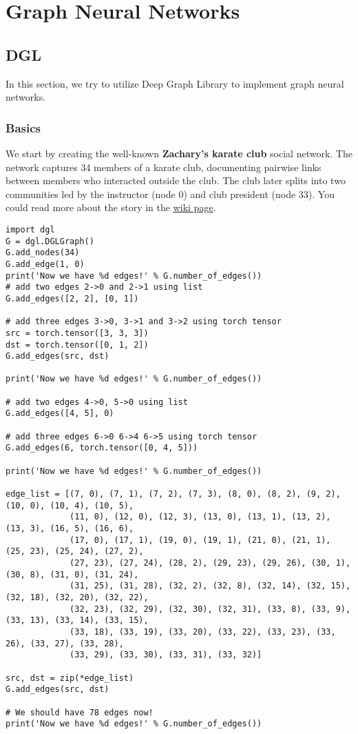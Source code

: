 \chapter{Graph Neural Networks}
\section{DGL}
In this section, we try to utilize Deep Graph Library to implement graph neural networks.

\subsection{Basics}
We start by creating the well-known \textbf{Zachary's karate club} social network. The network captures 34 members of a karate club, documenting pairwise links between members who interacted outside the club. The club later splits into two communities led by the instructor (node 0) and club president (node 33). You could read more about the story in the \href{https://en.wikipedia.org/wiki/Zachary\%27s_karate_club}{wiki page}. 

\begin{verbatim}
import dgl
G = dgl.DGLGraph()
G.add_nodes(34)
G.add_edge(1, 0)
print('Now we have %d edges!' % G.number_of_edges())
# add two edges 2->0 and 2->1 using list
G.add_edges([2, 2], [0, 1])

# add three edges 3->0, 3->1 and 3->2 using torch tensor
src = torch.tensor([3, 3, 3])
dst = torch.tensor([0, 1, 2])
G.add_edges(src, dst)

print('Now we have %d edges!' % G.number_of_edges())

# add two edges 4->0, 5->0 using list
G.add_edges([4, 5], 0)

# add three edges 6->0 6->4 6->5 using torch tensor
G.add_edges(6, torch.tensor([0, 4, 5]))

print('Now we have %d edges!' % G.number_of_edges())

edge_list = [(7, 0), (7, 1), (7, 2), (7, 3), (8, 0), (8, 2), (9, 2), (10, 0), (10, 4), (10, 5),
             (11, 0), (12, 0), (12, 3), (13, 0), (13, 1), (13, 2), (13, 3), (16, 5), (16, 6),
             (17, 0), (17, 1), (19, 0), (19, 1), (21, 0), (21, 1), (25, 23), (25, 24), (27, 2),
             (27, 23), (27, 24), (28, 2), (29, 23), (29, 26), (30, 1), (30, 8), (31, 0), (31, 24),
             (31, 25), (31, 28), (32, 2), (32, 8), (32, 14), (32, 15), (32, 18), (32, 20), (32, 22),
             (32, 23), (32, 29), (32, 30), (32, 31), (33, 8), (33, 9), (33, 13), (33, 14), (33, 15),
             (33, 18), (33, 19), (33, 20), (33, 22), (33, 23), (33, 26), (33, 27), (33, 28),
             (33, 29), (33, 30), (33, 31), (33, 32)]

src, dst = zip(*edge_list)
G.add_edges(src, dst)

# We should have 78 edges now!
print('Now we have %d edges!' % G.number_of_edges())
\end{verbatim}

